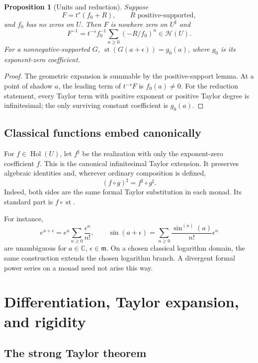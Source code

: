 \documentclass[11pt,letterpaper]{article}
\numberwithin{equation}{section}
\newtheorem{proposition}[theorem]{Proposition}
\theoremstyle{definition}
\theoremstyle{remark}
\newcommand{\C}{\mathbb{C}}
\newcommand{\mm}{\mathfrak{m}}
\newcommand{\HH}{\mathcal{H}}
\newcommand{\st}{\operatorname{st}}
\newcommand{\Hol}{\operatorname{Hol}}
\begin{document}
\begin{proposition}[Units and reduction]\label{prop:units}
Suppose
\begin{equation}\label{eq:normalized}
 F=t^s(f_0+R),\qquad R\text{ positive-supported},
\end{equation}
and $f_0$ has no zeros on $U$. Then $F$ is nowhere zero on $U^\sharp$ and
\begin{equation}\label{eq:inversegeometric}
 F^{-1}=t^{-s}f_0^{-1}\sum_{n\ge0}(-R/f_0)^n\in\HH(U).
\end{equation}
For a nonnegative-supported $G$, $\st(G(a+\epsilon))=g_0(a)$, where $g_0$
is its exponent-zero coefficient.
\end{proposition}
\begin{proof}
The geometric expansion is summable by the positive-support lemma. At a
point of shadow $a$, the leading term of $t^{-s}F$ is $f_0(a)\ne0$.
For the reduction statement, every Taylor term with positive exponent or
positive Taylor degree is infinitesimal; the only surviving constant
coefficient is $g_0(a)$.
\end{proof}

\subsection{Classical functions embed canonically}

For $f\in\Hol(U)$, let $f^\sharp$ be the realization with only the
exponent-zero coefficient $f$. This is the canonical infinitesimal Taylor
extension. It preserves algebraic identities and, wherever ordinary
composition is defined,
\[
 (f\circ g)^\sharp=f^\sharp\circ g^\sharp.
\]
Indeed, both sides are the same formal Taylor substitution in each monad.
Its standard part is $f\circ\st$.

For instance,
\[
 e^{a+\epsilon}=e^a\sum_{n\ge0}\frac{\epsilon^n}{n!},\qquad
 \sin(a+\epsilon)=\sum_{n\ge0}\frac{\sin^{(n)}(a)}{n!}\epsilon^n
\]
are unambiguous for $a\in\C$, $\epsilon\in\mm$. On a chosen classical
logarithm domain, the same construction extends the chosen logarithm branch.
A divergent formal power series on a monad need not arise this way.

\section{Differentiation, Taylor expansion, and rigidity}\label{sec:calculus}

\subsection{The strong Taylor theorem}
\end{document}
